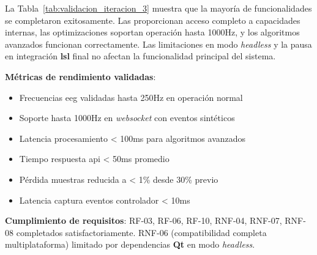La Tabla~\ref{tab:validacion_iteracion_3} muestra que la mayoría de funcionalidades se completaron exitosamente. Las  proporcionan acceso completo a capacidades internas, las optimizaciones soportan operación hasta 1000Hz, y los algoritmos avanzados funcionan correctamente. Las limitaciones en modo \textit{\gls{headless}} y la pausa en integración \textbf{\acrshort{lsl}} final no afectan la funcionalidad principal del sistema.

\textbf{Métricas de rendimiento validadas}:
\begin{itemize}
    \item Frecuencias \acrshort{eeg} validadas hasta 250Hz en operación normal
    \item Soporte hasta 1000Hz en \textit{\gls{websocket}} con eventos sintéticos
    \item Latencia procesamiento < 100ms para algoritmos avanzados
    \item Tiempo respuesta \acrshort{api} < 50ms promedio
    \item Pérdida muestras reducida a < 1\% desde 30\% previo
    \item Latencia captura eventos controlador < 10ms
\end{itemize}

\textbf{Cumplimiento de requisitos}: RF-03, RF-06, RF-10, RNF-04, RNF-07, RNF-08 completados satisfactoriamente. RNF-06 (compatibilidad completa multiplataforma) limitado por dependencias \textbf{Qt} en modo \textit{\gls{headless}}.
